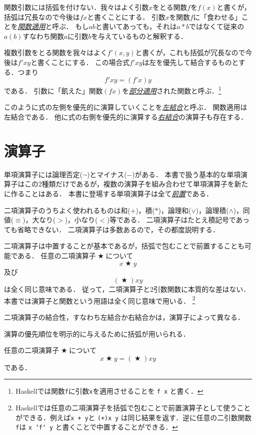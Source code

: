 \documentclass[twocolumn]{jsbook}
\newcommand{\keyword}[1]{\underline{\emph{#1}}}
\newcommand{\code}[1]{\texttt{#1}}
\newenvironment{point}{\begin{screen}}{\end{screen}}
\DeclareMathOperator{\mathAnyBinaryOperator}{\bigstar}
\begin{document}
関数引数には括弧を付けない．我々はよく引数$x$をとる関数$f$を$f(x)$と書くが，括弧は冗長なので今後は$fx$と書くことにする．
引数$x$を関数$f$に「食わせる」ことを\keyword{関数適用}と呼ぶ．
もし$ab$と書いてあっても，それは$a*b$ではなくて従来の$a(b)$すなわち関数$a$に引数$b$を与えているものと解釈する．

複数引数をとる関数を我々はよく$f'(x,y)$と書くが，これも括弧が冗長なので今後は$f'xy$と書くことにする．
この場合式$f'xy$は左を優先して結合するものとする．つまり$$f'xy=(f'x)y$$である．
引数に「飢えた」関数$(fx)$を\keyword{部分適用}された関数と呼ぶ．\footnote{Haskellでは関数\code{f}に引数\code{x}を適用させることを \code{f x} と書く．}

このように式の左側を優先的に演算していくことを\keyword{左結合}と呼ぶ．
関数適用は左結合である．
他に式の右側を優先的に演算する\keyword{右結合}の演算子も存在する．

\section{演算子}

単項演算子には論理否定($\neg$)とマイナス($-$)がある．
本書で扱う基本的な単項演算子はこの2種類だけであるが，複数の演算子を組み合わせて単項演算子を新たに作ることはある．
本書に登場する単項演算子は全て\keyword{前置}である．

二項演算子のうちよく使われるものは和($+$)，積($*$)，論理和($\vee$)，論理積($\wedge$)，同値($\equiv$)，大なり($>$)，小なり($<$)等である．
二項演算子はたとえ積記号であっても省略できない．
二項演算子は多数あるので，その都度説明する．

二項演算子は中置することが基本であるが，括弧で包むことで前置することも可能である．
任意の二項演算子$\mathAnyBinaryOperator$について$$x\mathAnyBinaryOperator y$$及び$$(\mathAnyBinaryOperator)xy$$は全く同じ意味である．
従って，二項演算子と2引数関数に本質的な差はない．
本書では演算子と関数という用語は全く同じ意味で用いる．
\footnote{Haskellでは任意の二項演算子を括弧で包むことで前置演算子として使うことができる．例えば\code{x + y}と \code{(+)x y} は同じ結果を返す．逆に任意の二引数関数\code{f}は \code{x `f` y} と書くことで中置することができる．}

二項演算子の結合性，すなわち左結合か右結合かは，演算子によって異なる．

演算の優先順位を明示的に与えるために括弧が用いられる．

\begin{point}
任意の二項演算子$\mathAnyBinaryOperator$について$$x\mathAnyBinaryOperator y=(\mathAnyBinaryOperator)xy$$である．
\end{point}
\end{document}
